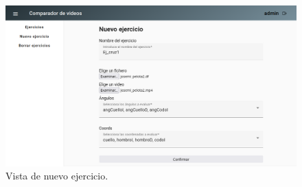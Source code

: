 \begin{figure}
	\centering
	\includegraphics[width=0.7\linewidth]{img/nuevo_ej}
	\caption{Vista de nuevo ejercicio.}
	\label{fig:nuevoej}
\end{figure}